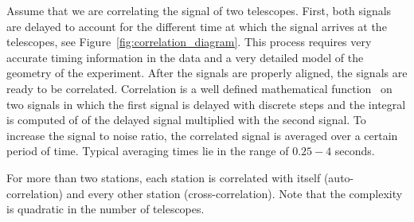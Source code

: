 Assume that we are correlating the signal of two telescopes. First,
both signals are delayed to account for the different time at which
the signal arrives at the telescopes, see
Figure~\ref{fig:correlation_diagram}.  This process requires very
accurate timing information in the data and a very detailed model of
the geometry of the experiment. After the signals are properly
aligned, the signals are ready to be correlated. Correlation is a well
defined mathematical function~\cite{def_correlation} on two signals in
which the first signal is delayed with discrete steps and the integral
is computed of of the delayed signal multiplied with the second
signal. To increase the signal to noise ratio, the correlated signal
is averaged over a certain period of time. Typical averaging times lie
in the range of $0.25-4$ seconds.

For more than two stations, each station is correlated with itself
(auto-correlation) and every other station (cross-correlation). Note
that the complexity is quadratic in the number of telescopes.


